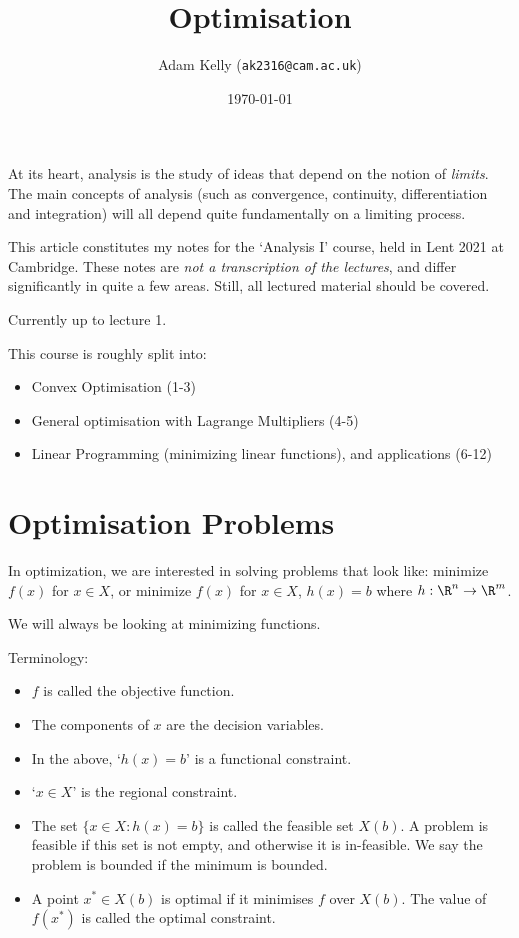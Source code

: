 \documentclass[a4paper]{scrartcl}
\title{Optimisation}
\author{Adam Kelly (\texttt{ak2316@cam.ac.uk})}
\date{\today}
\begin{document}
\maketitle

At its heart, analysis is the study of ideas that depend on the notion of \emph{limits}.
The main concepts of analysis (such as convergence, continuity, differentiation and integration) will all depend quite fundamentally on a limiting process.

This article constitutes my notes for the `Analysis I' course, held in Lent 2021 at Cambridge. These notes are \emph{not a transcription of the lectures}, and differ significantly in quite a few areas. Still, all lectured material should be covered.

{\color{purple}Currently up to lecture 1.}

\tableofcontents


This course is roughly split into:
\begin{itemize}
	\item Convex Optimisation (1-3)
	\item General optimisation with Lagrange Multipliers (4-5)
	\item Linear Programming (minimizing linear functions), and applications (6-12)
\end{itemize}

\section{Optimisation Problems}

In optimization, we are interested in solving problems that look like:
minimize $f(x)$ for $x \in X$, or minimize $f(x)$ for $x \in X$, $h(x) = b$ where $h : \R^n \rightarrow \R^m$.

We will always be looking at minimizing functions.

Terminology:
\begin{itemize}
	\item $f$ is called the objective function. 
	\item The components of $x$ are the decision variables.
	\item In the above, `$h(x) = b$' is a functional constraint.
	\item `$x \in X$' is the regional constraint.
	\item The set $\{x \in X : h(x) = b\}$ is called the feasible set $X(b)$. A problem is feasible if this set is not empty, and otherwise it is in-feasible. We say the problem is bounded if the minimum is bounded.
	\item A point $x^* \in X(b)$ is optimal if it minimises $f$ over $X(b)$. The value of $f(x^*)$ is called the optimal constraint.
\end{itemize}
\end{document}
